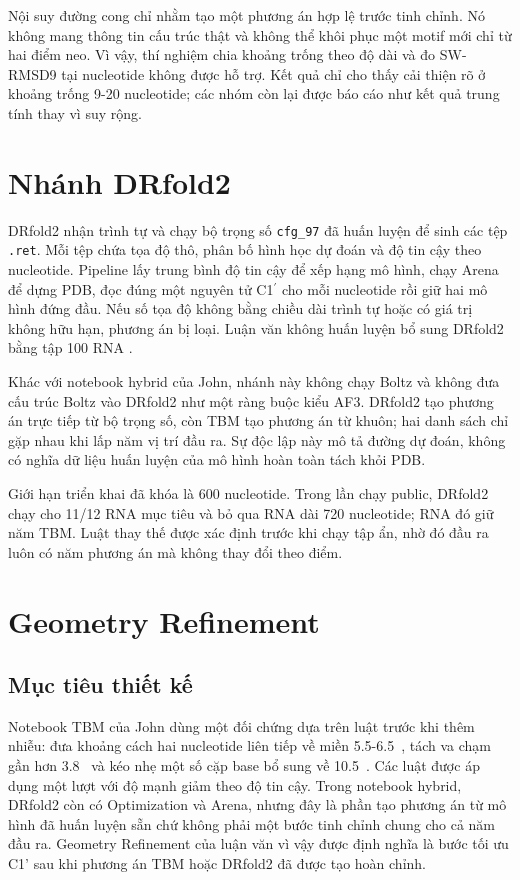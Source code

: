 \documentclass[12pt,a4paper,oneside]{report}
\newcommand{\cprime}{C1$^{\prime}$}
\newcommand{\angstrom}{\text{\AA}}
\begin{document}
Nội suy đường cong chỉ nhằm tạo một phương án hợp lệ trước tinh chỉnh. Nó không mang
thông tin cấu trúc thật và không thể khôi phục một motif mới chỉ từ hai điểm neo. Vì vậy,
thí nghiệm chia khoảng trống theo độ dài và đo SW-RMSD9 tại nucleotide không được hỗ trợ.
Kết quả chỉ cho thấy cải thiện rõ ở khoảng trống 9-20 nucleotide; các nhóm còn lại được báo cáo như kết quả trung
tính thay vì suy rộng.

\section{Nhánh DRfold2}

DRfold2 nhận trình tự và chạy bộ trọng số \texttt{cfg\_97} đã huấn luyện để sinh các tệp
\texttt{.ret}. Mỗi tệp chứa tọa độ thô, phân bố hình học dự đoán và độ tin cậy theo
nucleotide. Pipeline lấy trung bình độ tin cậy để xếp hạng mô hình, chạy Arena để dựng
PDB, đọc đúng một nguyên tử \cprime{} cho mỗi nucleotide rồi giữ hai mô hình đứng đầu.
Nếu số tọa độ không bằng chiều dài trình tự hoặc có giá trị không hữu hạn, phương án bị
loại. Luận văn không huấn luyện bổ sung DRfold2 bằng tập 100 RNA \cite{drfold,drfold2}.

Khác với notebook hybrid của John, nhánh này không chạy Boltz và không đưa cấu trúc Boltz
vào DRfold2 như một ràng buộc kiểu AF3. DRfold2 tạo phương án trực tiếp từ bộ trọng số,
còn TBM tạo phương án từ khuôn; hai danh sách chỉ gặp nhau khi lấp năm vị trí đầu ra.
Sự độc lập này mô tả đường dự đoán, không có nghĩa dữ liệu huấn luyện của mô hình hoàn
toàn tách khỏi PDB.

Giới hạn triển khai đã khóa là 600 nucleotide. Trong lần chạy public, DRfold2 chạy cho
11/12 RNA mục tiêu và bỏ qua RNA dài 720 nucleotide; RNA đó giữ năm TBM. Luật thay thế
được xác định trước khi chạy tập ẩn, nhờ đó đầu ra luôn có năm phương án mà không thay đổi
theo điểm.

\section{Geometry Refinement}

\subsection{Mục tiêu thiết kế}

Notebook TBM của John dùng một đối chứng dựa trên luật trước khi thêm nhiễu: đưa khoảng cách
hai nucleotide liên tiếp về miền 5.5-6.5~\angstrom{}, tách va chạm gần hơn
3.8~\angstrom{} và kéo nhẹ một số cặp base bổ sung về 10.5~\angstrom{}. Các luật được
áp dụng một lượt với độ mạnh giảm theo độ tin cậy. Trong notebook hybrid, DRfold2 còn có
Optimization và Arena, nhưng đây là phần tạo phương án từ mô hình đã huấn luyện sẵn chứ
không phải một bước tinh chỉnh chung cho cả năm đầu ra. Geometry Refinement của luận văn vì vậy được định
nghĩa là bước tối ưu C1' sau khi phương án TBM hoặc DRfold2 đã được tạo hoàn chỉnh.
\end{document}
